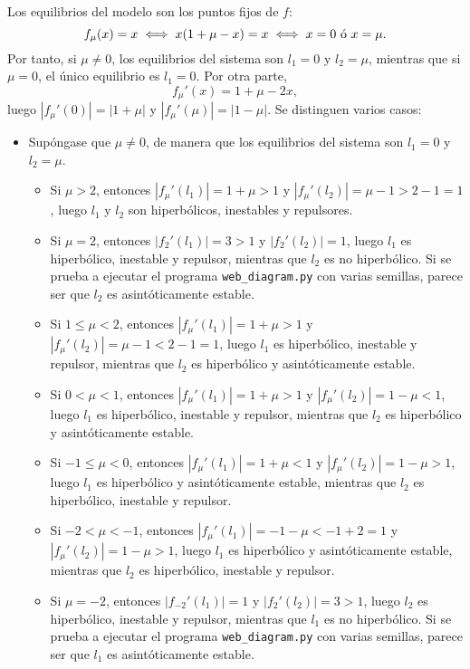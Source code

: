 \documentclass[11pt]{report}
\begin{document}
\begin{solution}
\begin{enumerate}
        Los equilibrios del modelo son los puntos fijos de $f$:
        \[f_\mu(x) = x \iff x(1+\mu-x) = x \iff x = 0 \textup{ ó } x = \mu.\]
        Por tanto, si $\mu\neq 0$, los equilibrios del sistema son $l_1 = 0$ y $l_2 = \mu$, mientras que si $\mu = 0$, el único equilibrio es $l_1 = 0$. Por otra parte,
        \[f_\mu'(x) = 1+\mu-2x,\]
        luego $|f_\mu'(0)| = |1+\mu|$ y $|f_\mu'(\mu)| = |1-\mu|$. Se distinguen varios casos:
        \begin{itemize}
            \item Supóngase que $\mu \neq 0$, de manera que los equilibrios del sistema son $l_1 = 0$ y $l_2 = \mu$.
            \begin{itemize}
                \item Si $\mu > 2$, entonces $|f_\mu'(l_1)| = 1+\mu > 1$ y $|f_\mu'(l_2)| = \mu-1 > 2-1=1$, luego $l_1$ y $l_2$ son hiperbólicos, inestables y repulsores.
                \item Si $\mu = 2$, entonces $|f_2'(l_1)| = 3 > 1$ y $|f_2'(l_2)| = 1$, luego $l_1$ es hiperbólico, inestable y repulsor, mientras que $l_2$ es no hiperbólico. Si se prueba a ejecutar el programa \texttt{web\_diagram.py} con varias semillas, parece ser que $l_2$ es asintóticamente estable.
                \item Si $1 \leq \mu < 2$, entonces $|f_\mu'(l_1)| = 1+\mu > 1$ y $|f_\mu'(l_2)| = \mu-1 < 2-1 = 1$, luego $l_1$ es hiperbólico, inestable y repulsor, mientras que $l_2$ es hiperbólico y asintóticamente estable.
                \item Si $0 < \mu < 1$, entonces $|f_\mu'(l_1)| = 1+\mu > 1$ y $|f_\mu'(l_2)| = 1-\mu < 1$, luego $l_1$ es hiperbólico, inestable y repulsor, mientras que $l_2$ es hiperbólico y asintóticamente estable. 
                \item Si $-1 \leq \mu < 0$, entonces $|f_\mu'(l_1)| = 1+\mu < 1$ y $|f_\mu'(l_2)| = 1-\mu > 1$, luego $l_1$ es hiperbólico y asintóticamente estable, mientras que $l_2$ es hiperbólico, inestable y repulsor.
                \item Si $-2 < \mu < -1$, entonces $|f_\mu'(l_1)| = -1-\mu<-1+2=1$ y $|f_\mu'(l_2)| = 1-\mu > 1$, luego $l_1$ es hiperbólico y asintóticamente estable, mientras que $l_2$ es hiperbólico, inestable y repulsor.
                \item Si $\mu = -2$, entonces $|f_{-2}'(l_1)| = 1$ y $|f_2'(l_2)| = 3>1$, luego $l_2$ es hiperbólico, inestable y repulsor, mientras que $l_1$ es no hiperbólico. Si se prueba a ejecutar el programa \texttt{web\_diagram.py} con varias semillas, parece ser que $l_1$ es asintóticamente estable.

\end{itemize}
\end{itemize}
\end{enumerate}
\end{solution}
\end{document}
